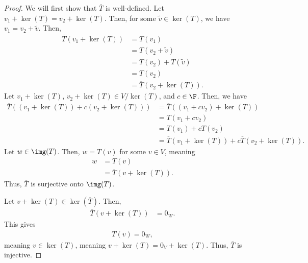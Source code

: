 \documentclass[10pt]{mypackage}
\begin{document}
\begin{proof}
  We will first show that $\overline{T}$ is well-defined. Let $v_1 + \ker(T) = v_2 + \ker(T)$. Then, for some $\tilde{v}\in \ker(T)$, we have $v_1 = v_2 + \tilde{v}$. Then,
  \begin{align*}
    \overline{T}\left(v_1 + \ker(T)\right) &= T\left(v_1\right)\\
                                           &= T\left(v_2 + \tilde{v}\right)\\
                                           &= T\left(v_2\right) + T\left(\tilde{v}\right)\\
                                           &= T\left(v_2\right)\\
                                           &= \overline{T}\left(v_2 + \ker(T)\right).
  \end{align*}
  Let $v_1 + \ker(T)$, $v_2 + \ker(T)\in V/\ker(T)$, and $c\in \F$. Then, we have
  \begin{align*}
    \overline{T}\left(\left(v_1 + \ker(T)\right) + c\left(v_2 + \ker(T)\right)\right) &= \overline{T}\left(\left(v_1 + cv_2\right) + \ker(T)\right)\\
                                                                                      &= T\left(v_1 + cv_2\right)\\
                                                                                      &= T\left(v_1\right) + cT\left(v_2\right)\\
                                                                                      &= \overline{T}\left(v_1 + \ker(T)\right) + c\overline{T}\left(v_2 + \ker(T)\right).
  \end{align*}
  Let $w\in \img(T)$. Then, $w = T(v)$ for some $v\in V$, meaning
  \begin{align*}
    w &= T\left(v\right)\\
    &= \overline{T} \left(v + \ker(T)\right).
  \end{align*}
  Thus, $\overline{T}$ is surjective onto $\img(T)$.\newline

  Let $v + \ker(T)\in \ker\left(\overline{T}\right)$. Then,
  \begin{align*}
    \overline{T}\left(v + \ker(T)\right) &= 0_W.
  \end{align*}
  This gives
  \begin{align*}
    T\left(v\right) = 0_W,
  \end{align*}
  meaning $v\in \ker(T)$, meaning $v + \ker(T) = 0_V + \ker(T)$. Thus, $\overline{T}$ is injective.
\end{proof}
\end{document}
